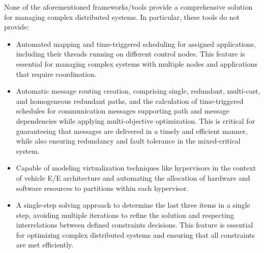 None of the aforementioned frameworks/tools provide a comprehensive solution for managing complex distributed systems. In particular, these tools do not provide:

\begin{itemize}
    
    \item Automated mapping and time-triggered scheduling for assigned applications, including their threads running on different control nodes. This feature is essential for managing complex systems with multiple nodes and applications that require coordination.

    
    
    \item Automatic message routing creation, comprising single, redundant, multi-cast, and homogeneous redundant paths, and the calculation of time-triggered schedules for communication messages supporting path and message dependencies while applying multi-objective optimization. This is critical for guaranteeing that messages are delivered in a timely and efficient manner, while also ensuring redundancy and fault tolerance in the mixed-critical system.
    
    \item  Capable of modeling virtualization techniques like hypervisors in the context of vehicle E/E architecture and automating the allocation of hardware and software resources to partitions within each hypervisor.
    
    
    \item A single-step solving approach to determine the last three items in a single step, avoiding multiple iterations to refine the solution and respecting interrelations between defined constraints decisions. This feature is essential for optimizing complex distributed systems and ensuring that all constraints are met efficiently.
    

\end{itemize}
